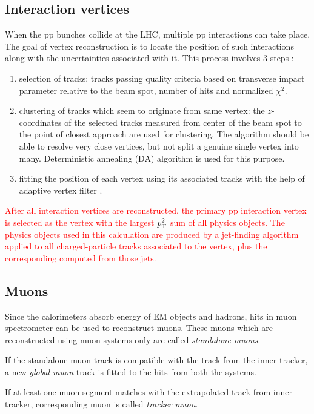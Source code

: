 \subsection{Interaction vertices}
When the pp bunches collide at the LHC, multiple pp interactions can take place. The goal of vertex reconstruction is to locate the position of such interactions along with the uncertainties associated with it. This process involves 3 steps \cite{Chatrchyan:2014fea}:
\begin{enumerate}
\item selection of tracks: tracks passing quality criteria based on transverse impact parameter relative to the beam spot, number of hits and normalized $\chi^2.$
\item clustering of tracks which seem to originate from same vertex: the $z$-coordinates of the selected tracks measured from center of the beam spot to the point of closest approach are used for clustering. 
The algorithm should be able to resolve very close vertices, but not split a genuine single vertex into many. Deterministic annealing (DA) algorithm \cite{a726788} \cite{Chatrchyan:2014fea} is used for this purpose.
\item fitting the position of each vertex using its associated tracks with the help of adaptive vertex filter \cite{Fruhwirth:2007hz}.
\end{enumerate}
\textcolor{red}{After all interaction vertices are reconstructed, the primary pp interaction vertex is selected as the vertex with the largest $p_{\mathrm{T}}^2$ sum of all physics objects. The physics objects used in this calculation are produced by a jet-finding algorithm ~\cite{Cacciari:2008gp,Cacciari:2011ma} applied to all charged-particle tracks associated to the vertex, plus the corresponding \ptmiss computed from those jets.}

\subsection{Muons}
Since the calorimeters absorb energy of EM objects and hadrons, hits in muon spectrometer can be used to reconstruct muons. These muons which are reconstructed using muon systems only are called \textit{standalone muons}.

If the standalone muon track is compatible with the track from the inner tracker, a new \textit{global muon} track is fitted to the hits from both the systems. 

If at least one muon segment matches with the extrapolated track from inner tracker, corresponding muon is called \textit{tracker muon}. 


